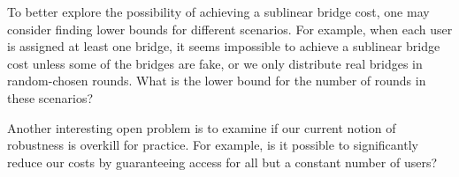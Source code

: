 \documentclass[USenglish,oneside,twocolumn]{article}
\begin{document}
To better explore the possibility of achieving a sublinear bridge cost, one may consider finding lower bounds for different scenarios. For example, when each user is assigned at least one bridge, it seems impossible to achieve a sublinear bridge cost unless some of the bridges are fake, or we only distribute real bridges in random-chosen rounds. What is the lower bound for the number of rounds in these scenarios?

Another interesting open problem is to examine if our current notion of robustness is overkill for practice. For example, is it possible to significantly reduce our costs by guaranteeing access for all but a constant number of users? %

\setlength{\bibsep}{0.3em}



%
\end{document}

